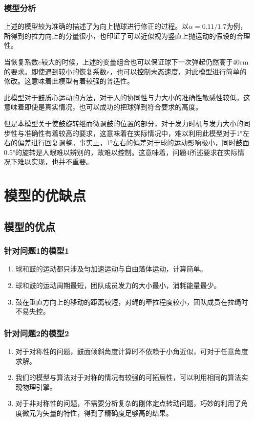 \documentclass[nocover]{cumcmart}%
\begin{document}
\subsubsection{模型分析}
上述的模型较为准确的描述了为向上抛球进行修正的过程。以$\alpha = 0.11/1.7$为例，所得到的拉力向上的分量很小，也印证了可以近似视为竖直上抛运动的假设的合理性。

当恢复系数$e$较大的时候，上述的变量组合也可以保证球下一次弹起仍然高于40cm的要求。即使遇到较小的恢复系数$e$，也可以控制末态速度，对此模型进行简单的修改。这意味着此模型有着较强的普适性。

此模型对于鼓质心运动的方法，对于人的协同性与力大小的准确性敏感性较低，这意味着即使是真实情况，也可以成功的把球弹到符合要求的高度。

但是本模型关于使鼓旋转继而微调鼓的位置的部分，对于发力时机与发力大小的同步性与准确性有着较高的要求，这意味着在实际情况中，难以利用此模型对于1°左右的偏差进行回复调整。事实上，1°左右的偏差对于球的运动影响极小，同时鼓面0.5°的旋转是人眼难以辨别的\cite{eyes}，故难以控制。这意味着，问题4所述要求在实际情况下难以实现，也并不重要。

\section{模型的优缺点}
\subsection{模型的优点}
\subsubsection{针对问题1的模型1}
\begin{enumerate}[(1)]
    \item 
球和鼓的运动都只涉及匀加速运动与自由落体运动，计算简单。
\item
球和鼓的运动周期最短，团队成员发力的大小最小，消耗能量最少。
\item
鼓在垂直方向上的移动的距离较短，对绳的牵拉程度较小，团队成员在拉绳时不易失控。
\end{enumerate}
\subsubsection{针对问题2的模型2}
\begin{enumerate}[(1)]
    \item 
对于对称性的问题，鼓面倾斜角度计算时不依赖于小角近似，可对于任意角度求解。
\item
我们的模型与算法对于对称的情况有较强的可拓展性，可以利用相同的算法实现物理引擎。
\item 对于非对称性的问题，不需要分析复杂的刚体定点转动问题，巧妙的利用了角度微元为矢量的特性，得到了精确度足够高的结果。
\end{enumerate}
\end{document}
